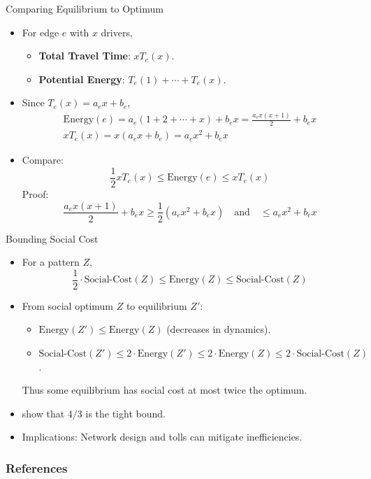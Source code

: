 \documentclass[10pt]{beamer}
\begin{document}
\begin{frame}{Comparing Equilibrium to Optimum}
  \begin{itemize}[<+->]
    \item For edge \( e \) with \( x \) drivers,
      \begin{itemize}
        \item \textbf{Total Travel Time}: \( x T_e(x) \).
        \item \textbf{Potential Energy}: \( T_e(1) + \cdots + T_e(x) \).
      \end{itemize}
    \item Since \( T_e(x) = a_e x + b_e \),
      \onslide<+->
      \begin{gather*}
        \text{Energy}(e) = a_e (1 + 2 + \cdots + x) + b_e x = \frac{a_e x (x+1)}{2} + b_e x \\
        x T_e(x) = x (a_e x + b_e) = a_e x^2 + b_e x
      \end{gather*}
    \item Compare: 
      \[\frac{1}{2} x T_e(x) \leqslant \text{Energy}(e) \leqslant x T_e(x)\]
      \onslide<+->
      Proof:
      \[\frac{a_e x (x+1)}{2} + b_e x \geqslant \frac{1}{2} (a_e x^2 + b_e x) \quad \text{and} \quad \leqslant a_e x^2 + b_e x\]
  \end{itemize}
\end{frame}


\begin{frame}{Bounding Social Cost}
  \begin{itemize}[<+->]
    \item For a pattern $Z$, 
      \[\frac{1}{2} \cdot \text{Social-Cost}(Z) \leqslant \text{Energy}(Z) \leqslant \text{Social-Cost}(Z)\]
    \item From social optimum \( Z \) to equilibrium \( Z' \):
      \begin{itemize}
        \item \( \text{Energy}(Z') \leqslant \text{Energy}(Z) \) (decreases in dynamics).
        \item \( \text{Social-Cost}(Z') \leqslant 2 \cdot \text{Energy}(Z') \leqslant 2 \cdot \text{Energy}(Z) \leqslant 2 \cdot \text{Social-Cost}(Z) \).
      \end{itemize}
      \onslide<+->
      Thus some equilibrium has social cost at most twice the optimum. 
    \item \cite{roughgarden02,roughgarden05} show that \( 4/3 \) is the tight bound.
    \item Implications: Network design and tolls can mitigate inefficiencies.
  \end{itemize}
\end{frame}

\begin{frame}%
  \frametitle{References}
  \nocite{*}
  
  
\end{frame}
\end{document}
